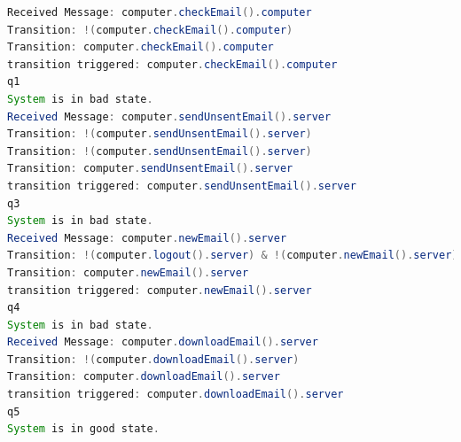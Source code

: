 \begin{lstlisting}[language=java, frame=single, float=ht!, caption={Időzítéses példa monitor kimenete.},captionpos=b]
Received Message: computer.checkEmail().computer
Transition: !(computer.checkEmail().computer)
Transition: computer.checkEmail().computer
transition triggered: computer.checkEmail().computer
q1
System is in bad state.
Received Message: computer.sendUnsentEmail().server
Transition: !(computer.sendUnsentEmail().server)
Transition: !(computer.sendUnsentEmail().server)
Transition: computer.sendUnsentEmail().server
transition triggered: computer.sendUnsentEmail().server
q3
System is in bad state.
Received Message: computer.newEmail().server
Transition: !(computer.logout().server) & !(computer.newEmail().server)
Transition: computer.newEmail().server
transition triggered: computer.newEmail().server
q4
System is in bad state.
Received Message: computer.downloadEmail().server
Transition: !(computer.downloadEmail().server)
Transition: computer.downloadEmail().server
transition triggered: computer.downloadEmail().server
q5
System is in good state.
\end{lstlisting}
